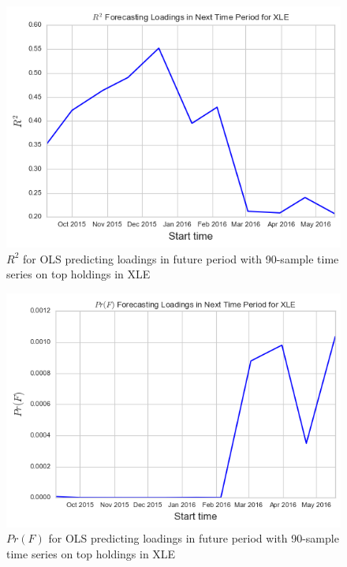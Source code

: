 \documentclass[12pt,twoside]{article}
\begin{document}
\bigbreak
\begin{figure}[H]
	\centering
	\includegraphics[scale=.7]{xle_R2_90D.png}
	\caption{$R^2$ for OLS predicting loadings in future period with 90-sample time series on top holdings in XLE}
	\label{fig:xle_R2}
\end{figure}
\bigbreak

\bigbreak
\begin{figure}[H]
	\centering
	\includegraphics[scale=.7]{xle_F_90D.png}
	\caption{$Pr(F)$ for OLS predicting loadings in future period with 90-sample time series on top holdings in XLE}
	\label{fig:xle_F}
\end{figure}
\bigbreak
\end{document}
